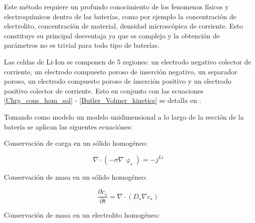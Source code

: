 \documentclass[10pt,a4paper]{article}
\begin{document}
	Este método requiere un profundo conocimiento de los fenomenos físicos y 
    electroquímicos dentro de las baterías, como por ejemplo la concentración 
    de electrolito, concentración de material, densidad microscópica de corriente. 
    Esto constituye su principal desventaja ya que es complejo y la obtención 
    de parámetros no es trivial para todo tipo de baterías.
	
	Las celdas de Li-Ion se componen de 5 regiones: un electrodo negativo 
    colector de corriente, un electrodo compuesto poroso de inserción negativo, 
    un separador poroso, un electrodo compuesto poroso de inserción positivo y 
    un electrodo positivo colector de corriente. Esto en conjunto con las 
    ecuaciones \ref{Chrg_cons_hom_sol} - \ref{Butler_Volmer_kinetics} se detalla 
    en \cite{Li2016}.
	
	
	\noindent Tomando como modelo un modelo unidimensional a lo largo de la 
    sección de la batería se aplican las siguentes ecuaciónes:
	
	\noindent Conservación de carga en un sólido homogéneo:

	\begin{figure}[h!]
		\begin{center}
			\begin{equation}
				\nabla \cdot (-\sigma\nabla\upvarphi_s)=-j^{Li} 
				\label{Chrg_cons_hom_sol}
			\end{equation}	
		\end{center}
	\end{figure}
	
	\noindent Conservación de masa en un sólido homogéneo:
	
	\begin{figure}[h!]
		\begin{center}
			\begin{equation}
				\frac{\partial c_s}{\partial t}=\nabla \cdot (D_s\nabla c_s) 
				\label{Mass_cons_hom_sol}
			\end{equation}	
		\end{center}
	\end{figure}
	
	\noindent Conservación de masa en un electrolito homogéneo:
	
\end{document}
